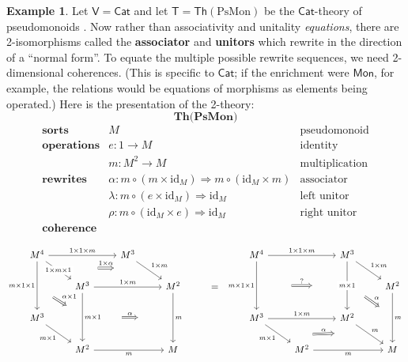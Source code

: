 \documentclass{amsart}
\theoremstyle{definition}
\newtheorem{example}[theorem]{Example}
\newcommand{\Th}{\mathsf{Th}}
\newcommand{\Cat}{\mathsf{Cat}}
\newcommand{\Mon}{\mathsf{Mon}}
\newcommand{\V}{\mathsf{V}}
\newcommand{\T}{\mathsf{T}}
\newcommand{\maps}{\colon}
\newcommand{\id}{\mathrm{id}}
\begin{document}
\begin{example}
	Let $\V = \Cat$ and let $\T = \Th(\mathrm{PsMon})$ be the $\Cat$-theory of pseudomonoids \cite{pseudo}. Now rather than associativity and unitality \textit{equations}, there are 2-isomorphisms called the \textbf{associator} and \textbf{unitors} which rewrite in the direction of a ``normal form''. To equate the multiple possible rewrite sequences, we need 2-dimensional coherences. (This is specific to $\Cat$; if the enrichment were $\Mon$, for example, the relations would be equations of morphisms as elements being operated.) Here is the presentation of the 2-theory:$$\textbf{Th(PsMon)}$$
	\[\begin{array}{rll}
	\textbf{sorts} & M & \text{pseudomonoid}\\
	\textbf{operations} & e\maps1 \to M & \text{identity}\\
	& m\maps M^2 \to M & \text{multiplication}\\
	\textbf{rewrites} & \alpha \colon m \circ (m \times \id_M) \Rightarrow m \circ (\id_M \times m) & \text{associator}\\
	& \lambda\maps  m \circ (e \times \id_M) \Rightarrow \id_M & \text{left unitor}\\
	& \rho\maps m \circ (\id_M \times e) \Rightarrow \id_M & \text{right unitor}\\
	\textbf{coherence}
          \end{array}\]

        \[\begin{tikzcd}
          M^4 \ar[rr,"1\times 1\times m"] \ar[dr,"1\times m\times 1" description, ""name=a1] \ar[dd, "m\times 1\times 1",swap,""name=b1] && M^3 \ar[dr, "1\times m",""name=a2] \arrow[Rightarrow,"1\times \alpha",from=a1,to=a2,shorten >=1.3cm,shorten <=1.3cm] &&& M^4 \ar[rr, "1\times 1\times m"] \ar[dd,"m\times 1\times 1",swap,""name=d1] && M^3 \ar[dd,"m\times 1" description,""name=d2] \ar[dr,"1\times m"] \arrow[Rightarrow,"?",from=d1,to=d2,shorten >=1.3cm,shorten <=1.3cm] & \\
          & M^3 \ar[rr,"1\times m"] \ar[dd,"m\times 1",""name=b2] \arrow[Rightarrow,"\alpha\times 1",from=b1,to=b2,shorten >=0.7cm,shorten <=0.7cm] && M^2 \ar[dd,"m",""name=c1] & = & &&& M^2 \ar[dd,"m",""name=f1] \arrow[Rightarrow,"\alpha",from=d2,to=f1,shorten >=0.6cm,shorten <=0.6cm] \arrow[Rightarrow,"\alpha",from=b2,to=c1,shorten >=1.3cm,shorten <=1.3cm] \\
          M^3 \ar[dr,"m\times 1",swap] &&& && M^3 \ar[rr,"1\times m"] \ar[dr,"m\times 1",swap,,""name=e1] && M^2 \ar[dr,"m",,""name=e2] \arrow[Rightarrow,"\alpha",from=e1,to=e2,shorten >=1.3cm,shorten <=1.3cm] & \\
          & M^2 \ar[rr,"m",swap] && M && & M^2 \ar[rr,"m",swap] && M
        \end{tikzcd}\]


\end{example}
\end{document}
